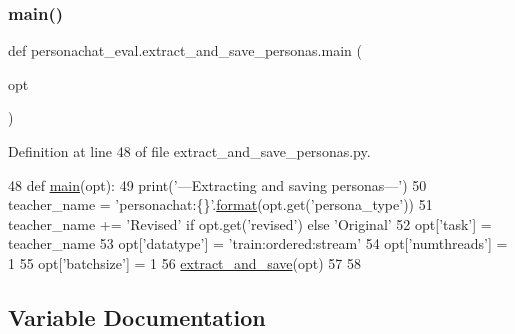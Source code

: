 \mbox{\label{namespacepersonachat__eval_1_1extract__and__save__personas_aa39f496bc78dfa28c1fbc2c4129a915c}} 
\subsubsection{\texorpdfstring{main()}{main()}}
{\footnotesize\ttfamily def personachat\+\_\+eval.\+extract\+\_\+and\+\_\+save\+\_\+personas.\+main (\begin{DoxyParamCaption}\item[{}]{opt }\end{DoxyParamCaption})}



Definition at line 48 of file extract\+\_\+and\+\_\+save\+\_\+personas.\+py.


\begin{DoxyCode}
48 \textcolor{keyword}{def }\hyperlink{namespacepersonachat__eval_1_1extract__and__save__personas_aa39f496bc78dfa28c1fbc2c4129a915c}{main}(opt):
49     print(\textcolor{stringliteral}{'---Extracting and saving personas---'})
50     teacher\_name = \textcolor{stringliteral}{'personachat:\{\}'}.\hyperlink{namespaceparlai_1_1chat__service_1_1services_1_1messenger_1_1shared__utils_a32e2e2022b824fbaf80c747160b52a76}{format}(opt.get(\textcolor{stringliteral}{'persona\_type'}))
51     teacher\_name += \textcolor{stringliteral}{'Revised'} \textcolor{keywordflow}{if} opt.get(\textcolor{stringliteral}{'revised'}) \textcolor{keywordflow}{else} \textcolor{stringliteral}{'Original'}
52     opt[\textcolor{stringliteral}{'task'}] = teacher\_name
53     opt[\textcolor{stringliteral}{'datatype'}] = \textcolor{stringliteral}{'train:ordered:stream'}
54     opt[\textcolor{stringliteral}{'numthreads'}] = 1
55     opt[\textcolor{stringliteral}{'batchsize'}] = 1
56     \hyperlink{namespacepersonachat__eval_1_1extract__and__save__personas_a7bae99c34a0b3f49cbce1328146926fd}{extract\_and\_save}(opt)
57 
58 
\end{DoxyCode}


\subsection{Variable Documentation}
\mbox{\label{namespacepersonachat__eval_1_1extract__and__save__personas_aa78b9367f11da5f51dff879d09b130db}} 
